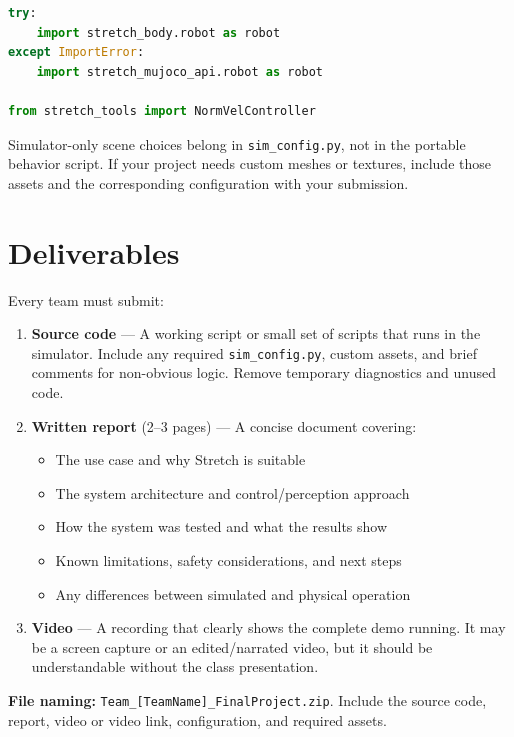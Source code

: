 \documentclass[11pt,a4paper]{article}
\begin{document}
\begin{lstlisting}[language=Python]
try:
    import stretch_body.robot as robot
except ImportError:
    import stretch_mujoco_api.robot as robot

from stretch_tools import NormVelController
\end{lstlisting}

Simulator-only scene choices belong in \texttt{sim\_config.py}, not in the
portable behavior script. If your project needs custom meshes or textures,
include those assets and the corresponding configuration with your submission.

\section*{Deliverables}

Every team must submit:

\begin{enumerate}
    \item \textbf{Source code} --- A working script or small set of scripts
          that runs in the simulator. Include any required
          \texttt{sim\_config.py}, custom assets, and brief comments for
          non-obvious logic. Remove temporary diagnostics and unused code.

    \item \textbf{Written report} (2--3 pages) --- A concise document covering:
    \begin{itemize}
        \item The use case and why Stretch is suitable
        \item The system architecture and control/perception approach
        \item How the system was tested and what the results show
        \item Known limitations, safety considerations, and next steps
        \item Any differences between simulated and physical operation
    \end{itemize}

    \item \textbf{Video} --- A recording that clearly shows the complete demo
          running. It may be a screen capture or an edited/narrated video, but
          it should be understandable without the class presentation.
\end{enumerate}

\textbf{File naming:}
\texttt{Team\_[TeamName]\_FinalProject.zip}. Include the source code, report,
video or video link, configuration, and required assets.
\end{document}
